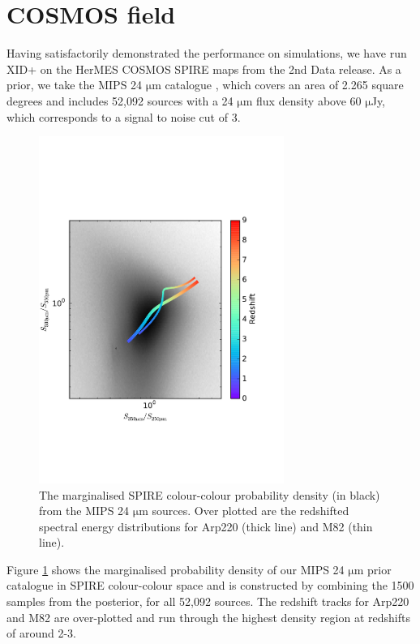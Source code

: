 \documentclass[useAMS,usenatbib]{mnras}
\begin{document}
\section{COSMOS field}\label{sec:COSMOS}
Having satisfactorily demonstrated the performance on simulations, we have run \textsc{XID+} on the HerMES COSMOS SPIRE maps from the 2nd Data release. As a prior, we take the MIPS 24 $\mathrm{\mu m}$ catalogue \citep{LeFLoch:2009}, which covers an area of 2.265 square degrees and includes 52,092 sources with a 24 $\mathrm{\mu m}$ flux density above 60 $\mathrm{\mu}$Jy, which corresponds to a signal to noise cut of 3.
\begin{figure} 
\includegraphics[width=8cm]{colour_colour_track}
\caption{The marginalised SPIRE colour-colour probability density (in black) from the MIPS 24 $\mathrm{\mu m}$ sources. Over plotted are the redshifted spectral energy distributions for Arp220 (thick line) and M82 (thin line)\protect\citep{Polletta:2007}.}\label{fig:col-col}
\end{figure}
Figure \ref{fig:col-col} shows the marginalised probability density of our MIPS 24 $\mathrm{\mu m}$ prior catalogue in SPIRE colour-colour space and is  constructed by combining the 1500 samples from the posterior, for all 52,092 sources. The redshift tracks for Arp220 and M82 \citep{Polletta:2007} are over-plotted and run through the highest density region at redshifts of around 2-3.
\end{document}
